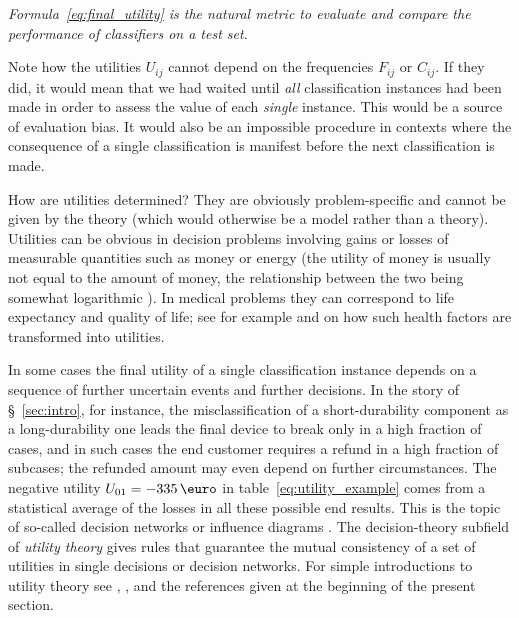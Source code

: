 \documentclass[\ifafour a4paper,12pt,\else a5paper,10pt,\fi%
onecolumn,oneside,article,%
british%
]{memoir}
\theoremstyle{remark}
\theoremstyle{innote}
\renewcommand*{\|}[1][]{\nonscript\:#1\vert\nonscript\:\mathopen{}}
\newcommand*{\sect}{\S}%
\newcommand*{\chap}{ch.}%
\newcommand*{\eg}{{e.g.}}
\begin{document}
\emph{Formula~\eqref{eq:final_utility} is the natural metric to evaluate and compare the performance of classifiers on a test set}.

Note how the utilities $U_{ij}$ cannot depend on the frequencies $F_{ij}$ or $C_{ij}$. If they did, it would mean that we had waited until \emph{all} classification instances had been made in order to assess the value of each \emph{single} instance. This would be a source of evaluation bias. It would also be an impossible procedure in contexts where the consequence of a single classification is manifest before the next classification is made.


How are utilities determined? They are obviously problem-specific and cannot be given by the theory (which would otherwise be a model rather than a theory). Utilities can be obvious in decision problems involving gains or losses of measurable quantities such as money or energy (the utility of money is usually not equal to the amount of money, the relationship between the two being somewhat logarithmic \autocites[\eg][pp.~203--204]{north1968}[\chap~4]{raiffa1968_r1970}). In medical problems they can correspond to life expectancy and quality of life; see for example \textcite[esp. \chap~8]{soxetal1988_r2013} and \textcite[esp. \chap~4]{huninketal2001_r2014} on how such health factors are transformed into utilities.

In some cases the final utility of a single classification instance depends on a sequence of further uncertain events and further decisions. In the story of \sect~\ref{sec:intro}, for instance, the misclassification of a short-durability component as a long-durability one leads the final device to break only in a high fraction of cases, and in such cases the end customer requires a refund in a high fraction of subcases; the refunded amount may even depend on further circumstances. The negative utility $U_{01} = -335\,\text{\texteuro}$ in table~\eqref{eq:utility_example} comes from a statistical average of the losses in all these possible end results. This is the topic of so-called decision networks or influence diagrams \autocites[Besides the general references already given:][\sect~15.5]{russelletal1995_r2022}{howardetal1984b_r2005}. The decision-theory subfield of \emph{utility theory} gives rules that guarantee the mutual consistency of a set of utilities in single decisions or decision networks. For simple introductions to utility theory see \textcite[\sect~15.2]{russelletal1995_r2022}, \textcite[pp.~201--205]{north1968}, and the references given at the beginning of the present section.
\end{document}
